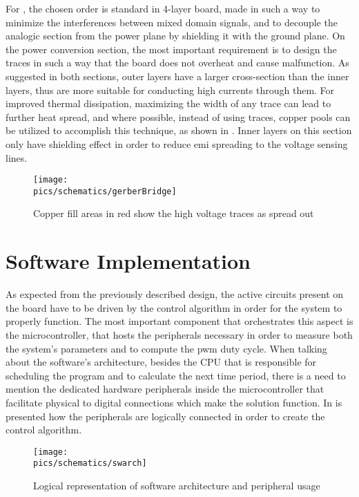 For , the chosen order is standard in 4-layer board, made in such a way to minimize the interferences between mixed domain signals, and to decouple the analogic section from the power plane by shielding it with the ground plane.
On the power conversion section, the most important requirement is to design the traces in such a way that the board does not overheat and cause malfunction.
As suggested in both sections, outer layers have a larger cross-section than the inner layers, thus are more suitable for conducting high currents through them.
For improved thermal dissipation, maximizing the width of any trace can lead to further heat spread, and where possible, instead of using traces, copper pools can be utilized to accomplish this technique, as shown in .
Inner layers on this section only have shielding effect in order to reduce \gls{emi} spreading to the voltage sensing lines.

\begin{figure}[!ht]
    \begin{center}\texttt{[image: \\pics/schematics/gerberBridge]}\end{center}
    \caption{Copper fill areas in red show the high voltage traces as spread out}
    \label{fig:gerberbridge}
\end{figure}

\section{Software Implementation}
\label{sec:swimp}

As expected from the previously described design, the active circuits present on the board have to be driven by the control algorithm in order for the system to properly function.
The most important component that orchestrates this aspect is the microcontroller, that hosts the peripherals necessary in order to measure both the system's parameters and to compute the \gls{pwm} duty cycle.
When talking about the software's architecture, besides the CPU that is responsible for scheduling the program and to calculate the next time period, there is a need to mention the dedicated hardware peripherals inside the microcontroller that facilitate physical to digital connections which make the solution function.
In  is presented how the peripherals are logically connected in order to create the control algorithm.
\begin{figure}[!ht]
    \begin{center}\texttt{[image: \\pics/schematics/swarch]}\end{center}
    \caption{Logical representation of software architecture and peripheral usage}
    \label{fig:swarch}
\end{figure}

